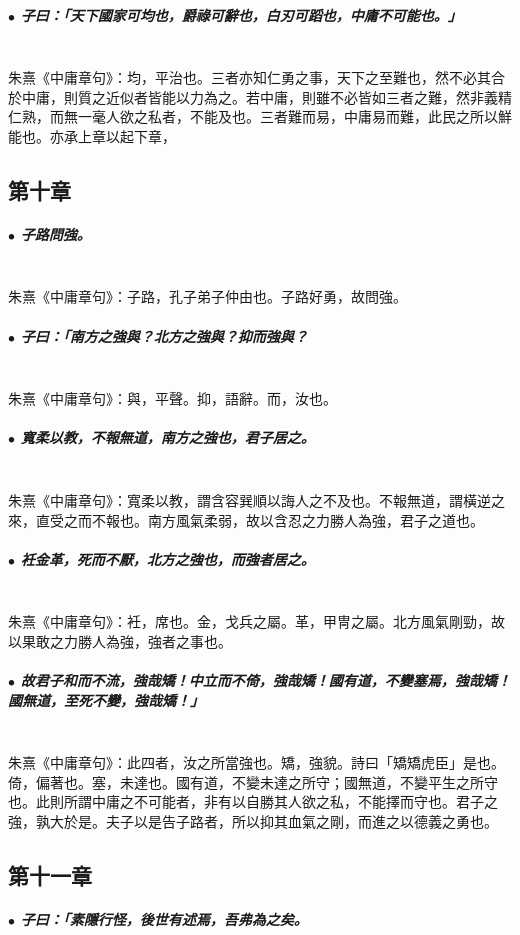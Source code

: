 \documentclass[hyperref, UTF8, 12pt, a4paper]{ctexrep}
\begin{document}
\subparagraph{$\bullet$ 子曰：「天下國家可均也，爵祿可辭也，白刃可蹈也，中庸不可能也。」} ~\\

朱熹《中庸章句》：均，平治也。三者亦知仁勇之事，天下之至難也，然不必其合於中庸，則質之近似者皆能以力為之。若中庸，則雖不必皆如三者之難，然非義精仁熟，而無一毫人欲之私者，不能及也。三者難而易，中庸易而難，此民之所以鮮能也。亦承上章以起下章，

\newpage
\subsection{第十章}

\subparagraph{$\bullet$ 子路問強。} ~\\

朱熹《中庸章句》：子路，孔子弟子仲由也。子路好勇，故問強。

\subparagraph{$\bullet$ 子曰：「南方之強與？北方之強與？抑而強與？} ~\\

朱熹《中庸章句》：與，平聲。抑，語辭。而，汝也。

\subparagraph{$\bullet$ 寬柔以教，不報無道，南方之強也，君子居之。} ~\\

朱熹《中庸章句》：寬柔以教，謂含容巽順以誨人之不及也。不報無道，謂橫逆之來，直受之而不報也。南方風氣柔弱，故以含忍之力勝人為強，君子之道也。

\subparagraph{$\bullet$ 衽金革，死而不厭，北方之強也，而強者居之。} ~\\

朱熹《中庸章句》：衽，席也。金，戈兵之屬。革，甲冑之屬。北方風氣剛勁，故以果敢之力勝人為強，強者之事也。

\subparagraph{$\bullet$ 故君子和而不流，強哉矯！中立而不倚，強哉矯！國有道，不變塞焉，強哉矯！國無道，至死不變，強哉矯！」} ~\\

朱熹《中庸章句》：此四者，汝之所當強也。矯，強貌。詩曰「矯矯虎臣」是也。倚，偏著也。塞，未達也。國有道，不變未達之所守；國無道，不變平生之所守也。此則所謂中庸之不可能者，非有以自勝其人欲之私，不能擇而守也。君子之強，孰大於是。夫子以是告子路者，所以抑其血氣之剛，而進之以德義之勇也。

\newpage
\subsection{第十一章}

\subparagraph{$\bullet$ 子曰：「素隱行怪，後世有述焉，吾弗為之矣。} ~\\
\end{document}
